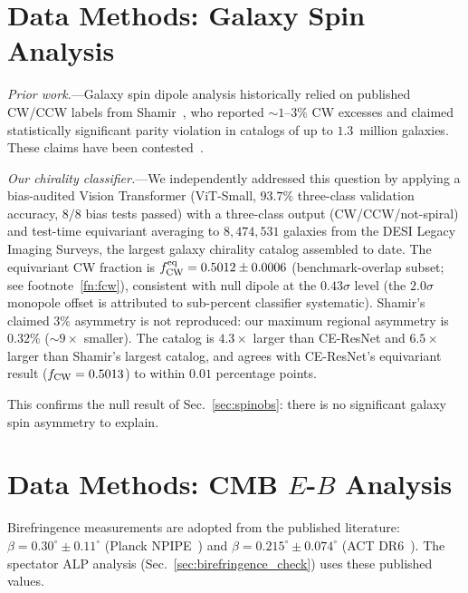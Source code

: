 \documentclass[aps,prd,twocolumn,superscriptaddress,showpacs,preprintnumbers,nofootinbib,longbibliography,floatfix]{revtex4-2}
\newcommand{\fcw}{f_{\rm CW}}
\begin{document}
\section{Data Methods: Galaxy Spin Analysis}\label{sec:data_galaxy}

\textit{Prior work.}---Galaxy spin dipole analysis historically relied on published CW/CCW labels from Shamir~\cite{Shamir2022,Shamir2024}, who reported ${\sim}1$--$3\%$ CW excesses and claimed statistically significant parity violation in catalogs of up to $1.3$~million galaxies. These claims have been contested~\cite{PatelDesmond2024,Philcox2025}.

\textit{Our chirality classifier.}---We independently addressed this question by applying a bias-audited Vision Transformer (ViT-Small, $93.7\%$ three-class validation accuracy, $8/8$ bias tests passed) with a three-class output (CW/CCW/not-spiral) and test-time equivariant averaging to $8{,}474{,}531$ galaxies from the DESI Legacy Imaging Surveys, the largest galaxy chirality catalog assembled to date.
The equivariant CW fraction is $\fcw^{\rm eq} = 0.5012 \pm 0.0006$ (benchmark-overlap subset; see footnote~\ref{fn:fcw}), consistent with null dipole at the $0.43\sigma$ level (the $2.0\sigma$ monopole offset is attributed to sub-percent classifier systematic). Shamir's claimed $3\%$ asymmetry is not reproduced: our maximum regional asymmetry is $0.32\%$ (${\sim}9\times$ smaller). The catalog is $4.3\times$ larger than CE-ResNet and $6.5\times$ larger than Shamir's largest catalog, and agrees with CE-ResNet's equivariant result ($\fcw = 0.5013$) to within $0.01$ percentage points.

This confirms the null result of Sec.~\ref{sec:spinobs}: there is no significant galaxy spin asymmetry to explain.



\section{Data Methods: CMB $E$-$B$ Analysis}\label{sec:data_cmb}
Birefringence measurements are adopted from the published literature: $\beta = 0.30^\circ \pm 0.11^\circ$ (Planck NPIPE~\cite{Eskilt2022}) and $\beta = 0.215^\circ \pm 0.074^\circ$ (ACT DR6~\cite{DiegoPalazuelos2025}). The spectator ALP analysis (Sec.~\ref{sec:birefringence_check}) uses these published values.
\end{document}
